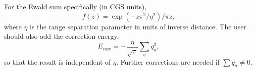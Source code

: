 \documentclass{amsart}
\begin{document}
  For the Ewald sum specifically (in CGS units),
\begin{equation}
f(z) = \exp(-z \pi^2/\eta^2) / \pi z,
\end{equation}
where $\eta$ is the range separation parameter in units of inverse distance.
The user should also add the correction energy,
\begin{equation}
E_\text{corr} = -\frac{\eta}{\sqrt{\pi}} \sum_a q_a^2
,
\end{equation}
so that the result is independent of $\eta$.  Further corrections
are needed if $\sum q_a \ne 0$.
\end{document}
